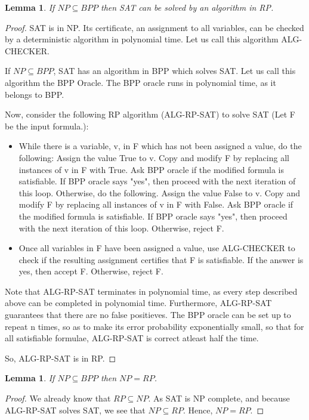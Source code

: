 \documentclass[10pt]{amsart}
\newtheorem{lem}[thm]{Lemma}
\theoremstyle{remark}
\begin{document}
\begin{lem}
If $NP\subseteq BPP$ then SAT can be solved by an algorithm in RP.
\end{lem}
\begin{proof}
SAT is in NP. Its certificate, an assignment to all variables, can be checked by a deterministic algorithm in polynomial time. Let us call this algorithm ALG-CHECKER.

If $NP\subseteq BPP$, SAT has an algorithm in BPP which solves SAT. Let us call this algorithm the BPP Oracle. The BPP oracle runs in polynomial time, as it belongs to BPP.

Now, consider the following RP algorithm (ALG-RP-SAT) to solve SAT (Let F be the input formula.):
\begin{itemize}
\item While there is a variable, v, in F which has not been assigned a value, do the following:
	\subitem Assign the value True to v. Copy and modify F by replacing all instances of v in F with True.
	\subitem Ask BPP oracle if the modified formula is satisfiable. If BPP oracle says "yes", then proceed with the next iteration of this loop. Otherwise, do the following.
	\subitem Assign the value False to v. Copy and modify F by replacing all instances of v in F with False.
	\subitem Ask BPP oracle if the modified formula is satisfiable. If BPP oracle says "yes", then proceed with the next iteration of this loop. Otherwise, reject F.
\item Once all variables in F have been assigned a value, use ALG-CHECKER to check if the resulting assignment certifies that F is satisfiable. If the answer is yes, then accept F. Otherwise, reject F.
\end{itemize}

Note that ALG-RP-SAT terminates in polynomial time, as every step described above can be completed in polynomial time. Furthermore, ALG-RP-SAT guarantees that there are no false positieves. The BPP oracle can be set up to repeat n times, so as to make its error probability exponentially small, so that for all satisfiable formulae, ALG-RP-SAT is correct atleast half the time.

So, ALG-RP-SAT is in RP.

\end{proof}

\begin{lem}
If $NP\subseteq BPP$ then $NP = RP$.
\end{lem}
\begin{proof}
We already know that $RP \subseteq NP$. As SAT is NP complete, and because ALG-RP-SAT solves SAT, we see that $NP \subseteq RP$. Hence, $NP = RP$.
\end{proof}



\end{document}
